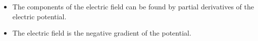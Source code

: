 \begin{itemize}
	\item The components of the electric field can be found by partial derivatives of the electric potential.
	\item The electric field is the negative gradient of the potential.
\end{itemize}






\newpage


